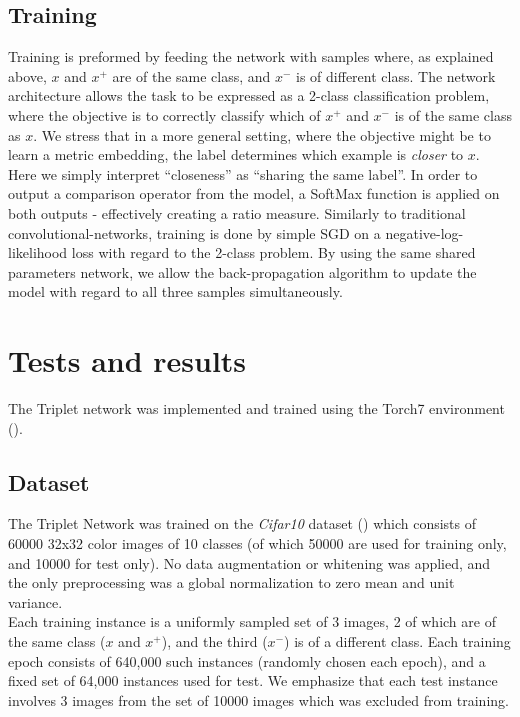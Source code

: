 \documentclass{article} %
\begin{document}
\subsection{Training}
Training is preformed by feeding the network with samples where, as explained above, $x$ and $x^{+}$ are of the same class, and $x^{-}$ is of different class.
The network architecture allows the task to be expressed as a 2-class classification problem, where the objective is to correctly classify  which of $x^+$ and $x^-$ is of the same class as $x$.
We stress that in a more general setting, where the objective might be to learn a metric embedding, 
the label determines which example is  \emph{closer} to $x$.
Here we simply interpret ``closeness'' as ``sharing the same label''.
In order to output a comparison operator from the model,
a SoftMax function is applied on both outputs - effectively creating a ratio measure.
Similarly to traditional convolutional-networks, training is done by simple SGD on a negative-log-likelihood loss with regard to the 2-class problem.
By using the same shared parameters network, we allow the back-propagation algorithm to update the model with regard to all three samples simultaneously.

\section{Tests and results}
 The Triplet network was implemented and trained using the Torch7 environment (\citet{collobert2011torch7}).
\subsection{Dataset}
The Triplet Network was trained on the \emph{Cifar10} dataset (\citet{krizhevsky2009learning}) which consists of 60000 32x32 color images of 10 classes (of which 50000 are used for training only, and 10000 for test only). No data augmentation or whitening was applied, and the only preprocessing was a global normalization to zero mean and unit variance.\\
Each training instance is a uniformly sampled set of 3 images, 2 of which are of the same class ($x$ and $x^{+}$), and the third ($x^{-}$) is of a different class. Each training epoch consists of 640,000 such instances (randomly chosen each epoch), and a fixed set of 64,000 instances used for test. We emphasize that each test instance involves 3 images from the set of 10000 images which was excluded from training.
\end{document}
